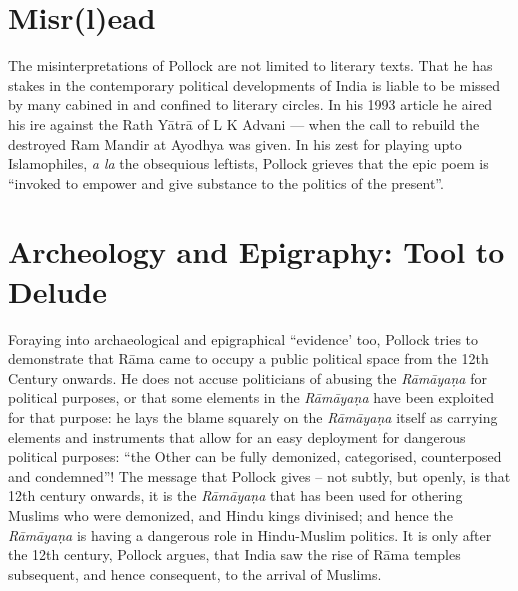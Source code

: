 \section*{Misr(l)ead}

The misinterpretations of Pollock are not limited to literary texts. That he has stakes in the contemporary political developments of India is liable to be missed by many cabined in and confined to literary circles. In his 1993 article he aired his ire against the Rath Yātrā of L K Advani --- when the call to rebuild the destroyed Ram Mandir at Ayodhya was given. In his zest for playing upto Islamophiles, {\sl a la} the obsequious leftists, Pollock grieves that the epic poem is “invoked to empower and give substance to the politics of the present”.\\[-20pt]

\section*{Archeology and Epigraphy: Tool to Delude}

Foraying into archaeological and epigraphical “evidence’ too, Pollock tries to demonstrate that Rāma came to occupy a public political space from the 12th Century onwards. He does not accuse politicians of abusing the {\sl Rāmāyaṇa} for political purposes, or that some elements in the {\sl Rāmāyaṇa} have been exploited for that purpose: he lays the blame squarely on the {\sl Rāmāyaṇa} itself as carrying elements and instruments that allow for an easy deployment for dangerous political purposes: “the Other can be fully demonized, categorised, counterposed and condemned”! The message that Pollock gives -- not subtly, but openly, is that 12th century onwards, it is the {\sl Rāmāyaṇa} that has been used for othering Muslims who were demonized, and Hindu kings divinised; and hence the {\sl Rāmāyaṇa} is having a dangerous role in Hindu-Muslim politics. It is only after the 12th century, Pollock argues, that India saw the rise of Rāma temples subsequent, and hence consequent, to the arrival of Muslims.

